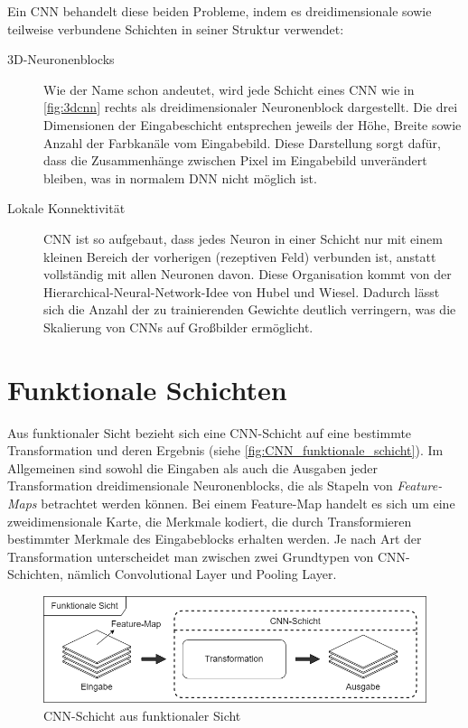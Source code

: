 Ein CNN behandelt diese beiden Probleme, indem es dreidimensionale sowie teilweise verbundene Schichten in seiner Struktur verwendet:

\begin{description}
	\item[3D-Neuronenblocks]
	
	Wie der Name schon andeutet, wird jede Schicht eines CNN wie in \autoref{fig:3dcnn} rechts als dreidimensionaler Neuronenblock dargestellt. Die drei Dimensionen der Eingabeschicht entsprechen jeweils der Höhe, Breite sowie Anzahl der Farbkanäle vom Eingabebild. Diese Darstellung sorgt dafür, dass die Zusammenhänge zwischen Pixel im Eingabebild unverändert bleiben, was in normalem DNN nicht möglich ist.

	\item[Lokale Konnektivität]
	
	CNN ist so aufgebaut, dass jedes Neuron in einer Schicht nur mit einem kleinen Bereich der vorherigen (rezeptiven Feld) verbunden ist, anstatt vollständig mit allen Neuronen davon. Diese Organisation kommt von der Hierarchical-Neural-Network-Idee von Hubel und Wiesel. Dadurch lässt sich die Anzahl der zu trainierenden Gewichte deutlich verringern, was die Skalierung von CNNs auf Großbilder ermöglicht.
	
\end{description}

\section{Funktionale Schichten} \label{sec:CNN-Funktionale_Schichten}

Aus funktionaler Sicht bezieht sich eine CNN-Schicht auf eine bestimmte Transformation und deren Ergebnis (siehe \autoref{fig:CNN_funktionale_schicht}). Im Allgemeinen sind sowohl die Eingaben als auch die Ausgaben jeder Transformation dreidimensionale Neuronenblocks, die als Stapeln von \emph{Feature-Maps} betrachtet werden können. Bei einem Feature-Map handelt es sich um eine zweidimensionale Karte, die Merkmale kodiert, die durch Transformieren bestimmter Merkmale des Eingabeblocks erhalten werden. Je nach Art der Transformation unterscheidet man zwischen zwei Grundtypen von CNN-Schichten, nämlich Convolutional Layer und Pooling Layer.

\begin{figure}[!hb]
	\centering
	\includegraphics[width=\linewidth]{images/CNN_funktionale_schicht}
	\caption{CNN-Schicht aus funktionaler Sicht}
	\label{fig:CNN_funktionale_schicht}
\end{figure}

